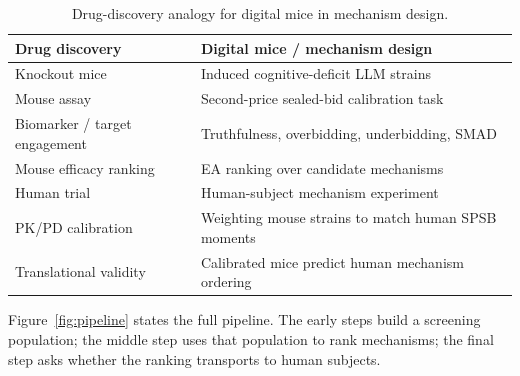 \documentclass[12pt]{article}
\newcommand{\SPSB}{SPSB}
\newcommand{\EA}{EA}
\begin{document}
\begin{table}[t]
\centering
\caption{Drug-discovery analogy for digital mice in mechanism design.}
\label{tab:analogy}
\small
\renewcommand{\arraystretch}{1.15}
\begin{tabular}{@{}p{}p{}@{}}
\toprule
Drug discovery & Digital mice / mechanism design \\
\midrule
Knockout mice & Induced cognitive-deficit LLM strains \\
Mouse assay & Second-price sealed-bid calibration task \\
Biomarker / target engagement & Truthfulness, overbidding, underbidding, SMAD \\
Mouse efficacy ranking & \EA{} ranking over candidate mechanisms \\
Human trial & Human-subject mechanism experiment \\
PK/PD calibration & Weighting mouse strains to match human \SPSB{} moments \\
Translational validity & Calibrated mice predict human mechanism ordering \\
\bottomrule
\end{tabular}
\end{table}

Figure~\ref{fig:pipeline} states the full pipeline. The early steps
build a screening population; the middle step uses that population to
rank mechanisms; the final step asks whether the ranking transports to
human subjects.
\end{document}

